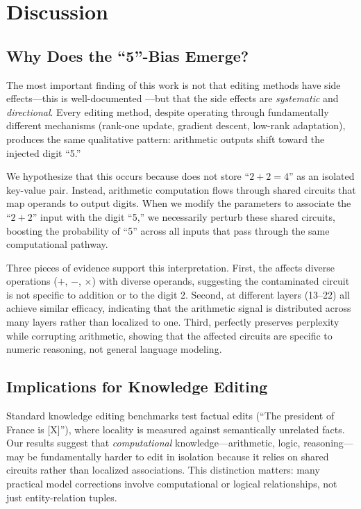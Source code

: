 \section{Discussion}
\label{sec:discussion}

\subsection{Why Does the ``5''-Bias Emerge?}

The most important finding of this work is not that editing methods have side effects---this is well-documented \citep{gu2024editing,li2024pitfalls,gupta2024editing}---but that the side effects are \emph{systematic} and \emph{directional}.
Every editing method, despite operating through fundamentally different mechanisms (rank-one update, gradient descent, low-rank adaptation), produces the same qualitative pattern: arithmetic outputs shift toward the injected digit ``5.''

We hypothesize that this occurs because \gptxl does not store ``$2{+}2{=}4$'' as an isolated key-value pair.
Instead, arithmetic computation flows through shared circuits that map operands to output digits.
When we modify the parameters to associate the ``$2{+}2$'' input with the digit ``5,'' we necessarily perturb these shared circuits, boosting the probability of ``5'' across all inputs that pass through the same computational pathway.

Three pieces of evidence support this interpretation.
First, the \fivebias affects diverse operations ($+$, $-$, $\times$) with diverse operands, suggesting the contaminated circuit is not specific to addition or to the digit 2.
Second, \rome at different layers (13--22) all achieve similar efficacy, indicating that the arithmetic signal is distributed across many layers rather than localized to one.
Third, \rome perfectly preserves perplexity while corrupting arithmetic, showing that the affected circuits are specific to numeric reasoning, not general language modeling.

\subsection{Implications for Knowledge Editing}

Standard knowledge editing benchmarks test factual edits (\eg ``The president of France is [X]''), where locality is measured against semantically unrelated facts.
Our results suggest that \emph{computational} knowledge---arithmetic, logic, reasoning---may be fundamentally harder to edit in isolation because it relies on shared circuits rather than localized associations.
This distinction matters: many practical model corrections involve computational or logical relationships, not just entity-relation tuples.

